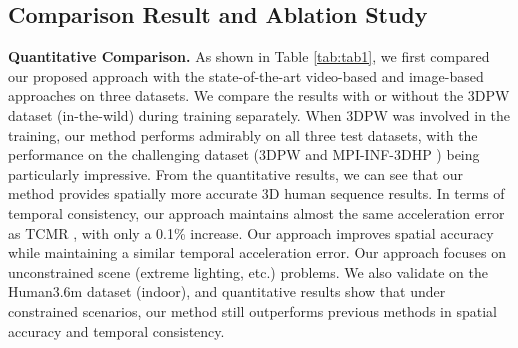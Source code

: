 \documentclass{bmvc2k}
\begin{document}
\subsection{Comparison Result and Ablation Study}
\textbf{Quantitative Comparison.} As shown in Table \ref{tab:tab1}, we first compared our proposed approach with the state-of-the-art video-based and image-based approaches on three datasets. We compare the results with or without the 3DPW dataset (in-the-wild) during training separately. When 3DPW was involved in the training, our method performs admirably on all three test datasets, with the performance on the challenging dataset (3DPW \cite{von2018recovering} and MPI-INF-3DHP \cite{mehta2017monocular}) being particularly impressive. From the quantitative results, we can see that our method provides spatially more accurate 3D human sequence results. In terms of temporal consistency, our approach maintains almost the same acceleration error as TCMR \cite{choi2021beyond}, with only a 0.1\% increase. Our approach improves spatial accuracy while maintaining a similar temporal acceleration error. Our approach focuses on unconstrained scene (extreme lighting, etc.) problems. We also validate on the Human3.6m dataset (indoor), and quantitative results show that under constrained scenarios, our method still outperforms previous methods in spatial accuracy and temporal consistency.
\end{document}
